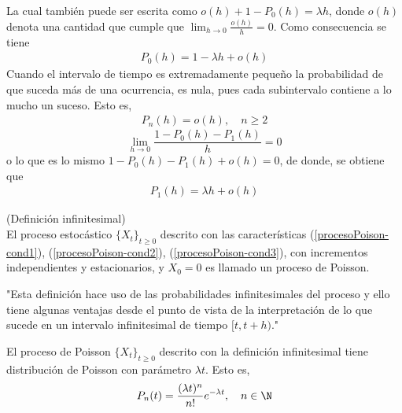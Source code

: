     \begin{comment}
    $X([a,b])$ es el número de ocurrencias en el intervalo $[a,b]$, sean $w_i$ el tiempo de espera antes de que pase una ocurrencia adicional después de la $i$-ésima ocurrencia.
    Dado $\epsilon>0$, se toma $\delta=\min\{w_i, i=1,2,\ldots,\lambda\}$, si $|h|<\delta$ , $X([(i-1)h,ih])$, $i=1,2,\ldots\lambda$ a lo mucho puede ser 1. entonces $1-P_0(h)=P_1(h)$ $|\frac{(1-P_0(h))}{h}-\lambda|=|N(P_1(h))-\lambda|=|N\frac{\lambda}{N}-\lambda|=0<\epsilon $, esto es:
    \end{comment}
    La cual también puede ser escrita como $o(h)+1-P_0(h)=\lambda h$, donde $o(h)$ denota una cantidad que cumple que $\lim_{h\rightarrow 0}\frac{o(h)}{h}=0$. Como consecuencia se tiene
    \begin{eqnarray}
        P_0(h)=1-\lambda h+o(h)
        \label{procesoPoison-cond1}
    \end{eqnarray}
    Cuando el intervalo de tiempo es extremadamente pequeño la probabilidad de que suceda más de una ocurrencia, es nula, pues cada subintervalo contiene a lo mucho un suceso. Esto es,
    \begin{eqnarray}
        P_n(h)=o(h),\quad n\geq 2
        \label{procesoPoison-cond2}
    \end{eqnarray}
    $$\lim_{h\rightarrow 0}\frac{1-P_0(h)-P_1(h)}{h}=0$$
    o lo que es lo mismo $1-P_0(h)-P_1(h)+o(h)=0$, de donde, se obtiene que
    \begin{eqnarray}
        P_1(h)=\lambda h+o(h)
         \label{procesoPoison-cond3}
    \end{eqnarray}
    \begin{Def}(Definición infinitesimal)\\
         El proceso estocástico $\{X_t\}_{t\geq 0}$
        descrito con las características (\ref{procesoPoison-cond1}), (\ref{procesoPoison-cond2}), (\ref{procesoPoison-cond3}), con incrementos independientes y estacionarios, y $X_0=0$ es llamado un proceso de Poisson.
    \end{Def}
    "Esta definición hace uso de las probabilidades infinitesimales del proceso y ello tiene algunas ventajas desde el punto de vista de la interpretación de
    lo que sucede en un intervalo infinitesimal de tiempo $[t,t+h)$."
    \begin{Prop}
        El proceso de Poisson $\{X_t\}_{t\geq 0}$ descrito con la definición infinitesimal tiene distribución de Poisson con parámetro $\lambda t.$ Esto es,
        $$P_n(t)=\frac{(\lambda t)^n}{n!}e^{-\lambda t}, \quad n\in\N$$
    \end{Prop}
